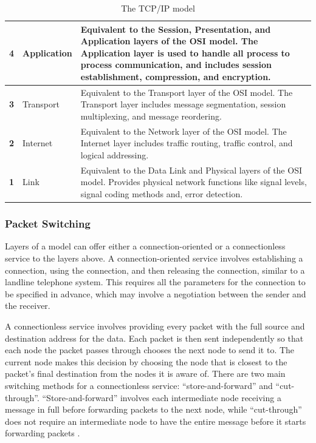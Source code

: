 \begin{table}[t]
  \caption{The TCP/IP model \cite{tcpip_pearson}}
  \begin{center}
    \begin{tabularx}{\textwidth}{|c|l|X|}
      \hline
      \textbf{4} & Application & Equivalent to the Session, Presentation, and Application layers of the OSI model. The Application layer is used to handle all process to process communication, and includes session establishment, compression, and encryption. \\ \hline
      \textbf{3} & Transport & Equivalent to the Transport layer of the OSI model. The Transport layer includes message segmentation, session multiplexing, and message reordering. \\ \hline
      \textbf{2} & Internet & Equivalent to the Network layer of the OSI model. The Internet layer includes traffic routing, traffic control, and logical addressing. \\ \hline
      \textbf{1} & Link & Equivalent to the Data Link and Physical layers of the OSI model. Provides physical network functions like signal levels, signal coding methods and, error detection. \\ \hline
    \end{tabularx}
  \end{center}
  \label{tcp_ip_model}
\end{table}

\subsubsection{Packet Switching}
Layers of a model can offer either a connection-oriented or a connectionless service to the layers above. A connection-oriented service involves establishing a connection, using the connection, and then releasing the connection, similar to a landline telephone system. This requires all the parameters for the connection to be specified in advance, which may involve a negotiation between the sender and the receiver.

A connectionless service involves providing every packet with the full source and destination address for the data. Each packet is then sent independently so that each node the packet passes through chooses the next node to send it to. The current node makes this decision by choosing the node that is closest to the packet's final destination from the nodes it is aware of. There are two main switching methods for a connectionless service: ``store-and-forward'' and ``cut-through''. ``Store-and-forward'' involves each intermediate node receiving a message in full before forwarding packets to the next node, while ``cut-through'' does not require an intermediate node to have the entire message before it starts forwarding packets \cite{tanenbaum}.

